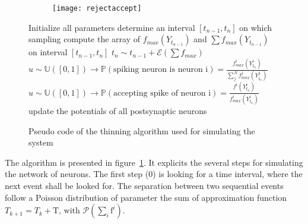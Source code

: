 \documentclass{report}
\begin{document}
	\begin{figure}
		\begin{subfigure}{\textwidth}
			\centering\texttt{[image: rejectaccept]}
		\end{subfigure}
		\begin{subalgorithm}{\textwidth}
			\caption{Pseudo code of the thinning algorithm used for simulating the system}
			\label{alg:pseudo-code}
			\centering\begin{algorithmic}
				\State Initialize all parameters
				\Repeat
					\Repeat{}
						\State determine an interval $[t_{n-1},t_n]$ on which sampling
						\State compute the array of $f_{max}(Y_{t_{n-1}})$ and $\sum f_{max}(Y_{t_{n-1}})$ on interval $[t_{n-1},t_n]$
						\State $t_n\sim t_{n-1}+\mathscr{E}(\sum f_{max})$
					\State $u\sim\mathbb{U}([0,1])\rightarrow \mathbb{P}(\text{spiking neuron is neuron i})=\frac{f_{max}^i(Y_{t_n}^i)}{\sum_j^N f_{max}^j(Y_{t_n}^j)}$
					\State $u\sim\mathbb{U}([0,1])\rightarrow \mathbb{P}(\text{accepting spike of neuron i})=\frac{f^i(Y_{t_n}^i)}{f_{max}^i(Y_{t_n}^i)}$
						update the potentials of all postsynaptic neurons
					\EndIf
			\end{algorithmic}
		\end{subalgorithm}
		\label{fig:rejacc}
	\end{figure}
	The algorithm is presented in figure~\ref{fig:rejacc}. It explicits the several steps for simulating the network of neurons. The first step (0) is looking for a time interval, where the next event shall be looked for. The separation between two sequential events follow a Poisson distribution of parameter the sum of approximation function $T_{k+1}=T_k+\text{\~T}\text{, with }\mathscr{P}(\sum_i\text{\~f}^i)$.
\end{document}
